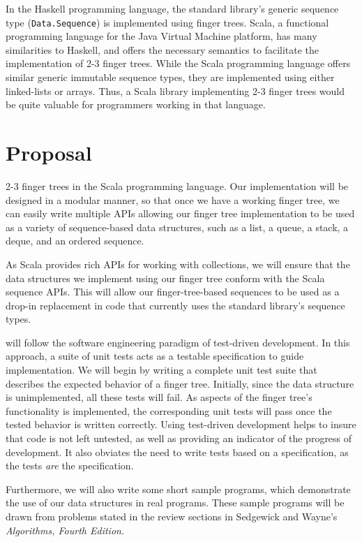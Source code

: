 \documentclass[a4paper,nobib]{tufte-handout}
\begin{document}
In the Haskell programming language, the standard library's generic sequence type (\Verb|Data.Sequence|) is implemented using finger trees.\cite[-1in]{data_sequence} Scala, a functional programming language for the Java Virtual Machine platform, has many similarities to Haskell,\cite{odersky2004overview} and offers the necessary semantics to facilitate the implementation of 2-3 finger trees. While the Scala programming language offers similar generic immutable sequence types, they are implemented using either linked-lists or arrays.\cite{scala_std} Thus, a Scala library implementing 2-3 finger trees would be quite valuable for programmers working in that language.

\section{Proposal}

 2-3 finger trees in the Scala programming language. Our implementation will be designed in a modular manner, so that once we have a working finger tree, we can easily write multiple APIs allowing our finger tree implementation to be used as a variety of sequence-based data structures, such as a list, a queue, a stack, a deque, and an ordered sequence.

As Scala provides rich APIs for working with collections, we will ensure that the data structures we implement using our finger tree conform with the Scala sequence APIs. This will allow our finger-tree-based sequences to be used as a drop-in replacement in code that currently uses the standard library's sequence types. 

 will follow the software engineering paradigm of test-driven development. In this approach, a suite of unit tests acts as a testable specification to guide implementation. We will begin by writing a complete unit test suite that describes the expected behavior of a finger tree. Initially, since the data structure is unimplemented, all these tests will fail. As aspects of the finger tree's functionality is implemented, the corresponding unit tests will pass once the tested behavior is written correctly. Using test-driven development helps to insure that code is not left untested, as well as providing an indicator of the progress of development. It also obviates the need to write tests based on a specification, as the tests \textit{are} the specification.

Furthermore, we will also write some short sample programs, which demonstrate the use of our data structures in real programs. These sample programs will be drawn from problems stated in the review sections in Sedgewick and Wayne's \textit{Algorithms, Fourth Edition}.
\end{document}
